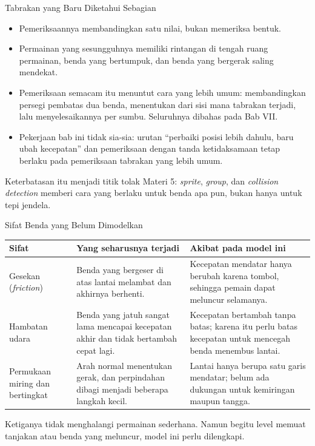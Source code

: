 \documentclass[aspectratio=169,10pt]{beamer}
\begin{document}
\begin{frame}{Tabrakan yang Baru Diketahui Sebagian}
\begin{itemize}
  \item Pemeriksaannya membandingkan satu nilai, bukan memeriksa bentuk.
  \item Permainan yang sesungguhnya memiliki rintangan di tengah ruang
        permainan, benda yang bertumpuk, dan benda yang bergerak saling
        mendekat.
  \item Pemeriksaan semacam itu menuntut cara yang lebih umum: membandingkan
        persegi pembatas dua benda, menentukan dari sisi mana tabrakan terjadi,
        lalu menyelesaikannya per sumbu. Seluruhnya dibahas pada Bab VII.
  \item Pekerjaan bab ini tidak sia-sia: urutan ``perbaiki posisi lebih dahulu,
        baru ubah kecepatan'' dan pemeriksaan dengan tanda ketidaksamaan tetap
        berlaku pada pemeriksaan tabrakan yang lebih umum.
\end{itemize}
\begin{kiat}
Keterbatasan itu menjadi titik tolak Materi 5: \emph{sprite}, \emph{group}, dan
\emph{collision detection} memberi cara yang berlaku untuk benda apa pun,
bukan hanya untuk tepi jendela.
\end{kiat}
\end{frame}

\begin{frame}{Sifat Benda yang Belum Dimodelkan}
{\scriptsize
\renewcommand{\arraystretch}{1.16}
\begin{tabularx}{\textwidth}{@{}>{\raggedright\arraybackslash}p{3.0cm}
    >{\raggedright\arraybackslash}p{5.3cm}
    >{\raggedright\arraybackslash}X@{}}
\toprule
\textbf{Sifat} & \textbf{Yang seharusnya terjadi} & \textbf{Akibat pada model
  ini} \\
\midrule
Gesekan (\emph{friction}) &
  Benda yang bergeser di atas lantai melambat dan akhirnya berhenti. &
  Kecepatan mendatar hanya berubah karena tombol, sehingga pemain dapat
  meluncur selamanya. \\
\addlinespace
Hambatan udara &
  Benda yang jatuh sangat lama mencapai kecepatan akhir dan tidak bertambah
  cepat lagi. &
  Kecepatan bertambah tanpa batas; karena itu perlu batas kecepatan untuk
  mencegah benda menembus lantai. \\
\addlinespace
Permukaan miring dan bertingkat &
  Arah normal menentukan gerak, dan perpindahan dibagi menjadi beberapa langkah
  kecil. &
  Lantai hanya berupa satu garis mendatar; belum ada dukungan untuk kemiringan
  maupun tangga. \\
\bottomrule
\end{tabularx}}
\vspace{0.14cm}
\begin{kotak}
Ketiganya tidak menghalangi permainan sederhana. Namun begitu level memuat
tanjakan atau benda yang meluncur, model ini perlu dilengkapi.
\end{kotak}
\end{frame}
\end{document}

